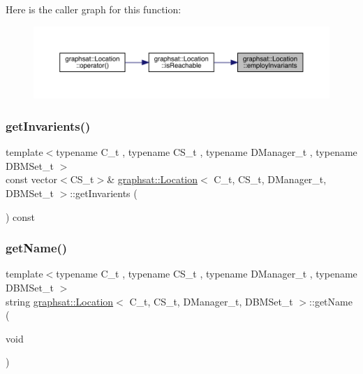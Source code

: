 Here is the caller graph for this function\+:
\nopagebreak
\begin{figure}[H]
\begin{center}
\leavevmode
\includegraphics[width=350pt]{classgraphsat_1_1_location_ab4e8969e19d19b13c5fd77a6eb84e0df_icgraph}
\end{center}
\end{figure}
\mbox{\label{classgraphsat_1_1_location_ae95156bd9f528f92865ef8c51b9a6637}} 
\subsubsection{\texorpdfstring{getInvarients()}{getInvarients()}}
{\footnotesize\ttfamily template$<$typename C\+\_\+t , typename C\+S\+\_\+t , typename D\+Manager\+\_\+t , typename D\+B\+M\+Set\+\_\+t $>$ \\
const vector$<$C\+S\+\_\+t$>$\& \mbox{\hyperlink{classgraphsat_1_1_location}{graphsat\+::\+Location}}$<$ C\+\_\+t, C\+S\+\_\+t, D\+Manager\+\_\+t, D\+B\+M\+Set\+\_\+t $>$\+::get\+Invarients (\begin{DoxyParamCaption}{ }\end{DoxyParamCaption}) const\hspace{0.3cm}{\ttfamily [inline]}}

\mbox{\label{classgraphsat_1_1_location_a87ad30703a6e50c0f73320251eeb95a3}} 
\subsubsection{\texorpdfstring{getName()}{getName()}}
{\footnotesize\ttfamily template$<$typename C\+\_\+t , typename C\+S\+\_\+t , typename D\+Manager\+\_\+t , typename D\+B\+M\+Set\+\_\+t $>$ \\
string \mbox{\hyperlink{classgraphsat_1_1_location}{graphsat\+::\+Location}}$<$ C\+\_\+t, C\+S\+\_\+t, D\+Manager\+\_\+t, D\+B\+M\+Set\+\_\+t $>$\+::get\+Name (\begin{DoxyParamCaption}\item[{void}]{ }\end{DoxyParamCaption})\hspace{0.3cm}{\ttfamily [inline]}}

